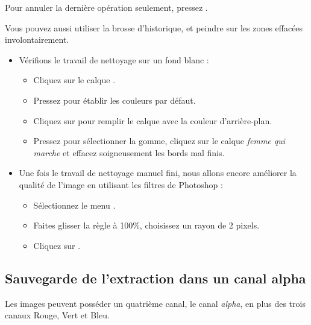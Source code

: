 \documentclass[a4paper,12pt,french]{sphinxmanual}
\begin{document}
Pour annuler la dernière opération seulement, pressez .

Vous pouvez aussi utiliser la brosse d'historique, et peindre sur les zones effacées involontairement.
\begin{itemize}
\item {} 
Vérifions le travail de nettoyage sur un fond blanc :
\begin{itemize}
\item {} 
Cliquez sur le calque .

\item {} 
Pressez  pour établir les couleurs par défaut.

\item {} 
Cliquez sur  pour remplir le calque avec la couleur d'arrière-plan.

\item {} 
Pressez  pour sélectionner la gomme, cliquez sur le calque \emph{femme qui marche} et effacez soigneusement les bords mal finis.

\end{itemize}

\item {} 
Une fois le travail de nettoyage manuel fini, nous allons encore améliorer la qualité de l'image en utilisant les filtres de Photoshop :
\begin{itemize}
\item {} 
Sélectionnez le menu .

\item {} 
Faites glisser la règle à 100\%, choisissez un rayon de 2 pixels.

\item {} 
Cliquez sur .

\end{itemize}

\end{itemize}


\subsection{Sauvegarde de l'extraction dans un canal alpha}
\label{psd/detourage:sauvegarde-de-l-extraction-dans-un-canal-alpha}
Les images peuvent posséder un quatrième canal, le canal \emph{alpha}, en plus des trois canaux Rouge, Vert et Bleu.
\end{document}
